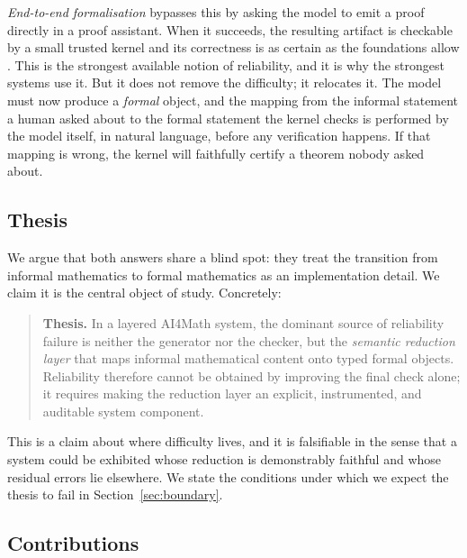 \documentclass[11pt,a4paper]{article}
\theoremstyle{definition}
\theoremstyle{plain}
\theoremstyle{remark}
\begin{document}
\emph{End-to-end formalisation} bypasses this by asking the model to emit a
proof directly in a proof assistant. When it succeeds, the resulting artifact
is checkable by a small trusted kernel and its correctness is as certain as the
foundations allow \cite{demoura2015lean,mathlib2020lean}. This is the strongest
available notion of reliability, and it is why the strongest systems use it.
But it does not remove the difficulty; it relocates it. The model must now
produce a \emph{formal} object, and the mapping from the informal statement a
human asked about to the formal statement the kernel checks is performed by the
model itself, in natural language, before any verification happens. If that
mapping is wrong, the kernel will faithfully certify a theorem nobody asked
about.

\subsection{Thesis}

We argue that both answers share a blind spot: they treat the transition from
informal mathematics to formal mathematics as an implementation detail. We claim
it is the central object of study. Concretely:

\begin{quote}
\textbf{Thesis.} In a layered AI4Math system, the dominant source of
reliability failure is neither the generator nor the checker, but the
\emph{semantic reduction layer} that maps informal mathematical content onto
typed formal objects. Reliability therefore cannot be obtained by improving
the final check alone; it requires making the reduction layer an explicit,
instrumented, and auditable system component.
\end{quote}

This is a claim about where difficulty lives, and it is falsifiable in the
sense that a system could be exhibited whose reduction is demonstrably faithful
and whose residual errors lie elsewhere. We state the conditions under which we
expect the thesis to fail in Section~\ref{sec:boundary}.

\subsection{Contributions}
\end{document}
